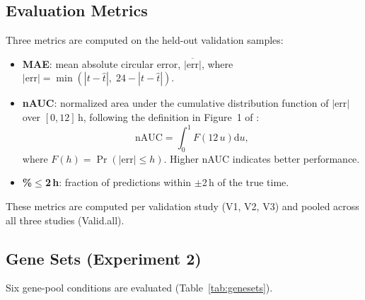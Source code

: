 \documentclass[10pt,a4paper]{article}
\begin{document}
\subsection{Evaluation Metrics}
 
Three metrics are computed on the held-out validation samples:
\begin{itemize}
  \item \textbf{MAE}: mean absolute circular error,
    $\overline{|\mathrm{err}|}$, where
    $|\mathrm{err}| = \min(|t - \hat t|,\; 24 - |t - \hat t|)$.
  \item \textbf{nAUC}: normalized area under the cumulative
    distribution function of $|\mathrm{err}|$ over $[0,12]$\,h,
    following the definition in Figure~1 of \citet{Braun2018}:
    \begin{equation}
      \mathrm{nAUC} = \int_0^1 F\!\left(12\,u\right) \mathrm{d}u,
      \label{eq:nauc}
    \end{equation}
    where $F(h) = \Pr(|\mathrm{err}| \leq h)$.
    Higher nAUC indicates better performance.
  \item \textbf{\%$\leq$2\,h}: fraction of predictions within
    $\pm$2\,h of the true time.
\end{itemize}
These metrics are computed per validation study (V1, V2, V3) and
pooled across all three studies (Valid.all).
 
\subsection{Gene Sets (Experiment 2)}
 
Six gene-pool conditions are evaluated (Table~\ref{tab:genesets}).
 
\end{document}
